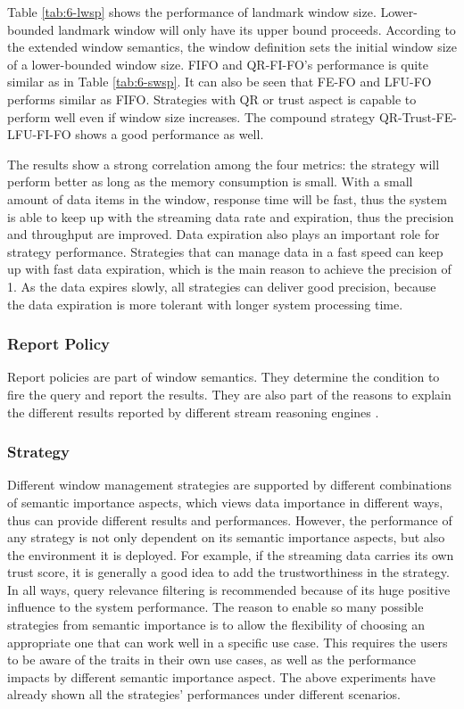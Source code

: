 Table \ref{tab:6-lwsp} shows the performance of landmark window size. 
Lower-bounded landmark window will only have its upper bound proceeds. 
According to the extended window semantics, the window definition sets the initial window size of a lower-bounded window size. 
FIFO and QR-FI-FO's performance is quite similar as in Table \ref{tab:6-swsp}. 
It can also be seen that FE-FO and LFU-FO performs similar as FIFO. 
Strategies with QR or trust aspect is capable to perform well even if window size increases. 
The compound strategy QR-Trust-FE-LFU-FI-FO shows a good performance as well. 

The results show a strong correlation among the four metrics: the strategy will perform better as long as the memory consumption is small.
With a small amount of data items in the window, response time will be fast, thus the system is able to keep up with the streaming data rate and expiration, thus the precision and throughput are improved. 
Data expiration also plays an important role for strategy performance. 
Strategies that can manage data in a fast speed can keep up with fast data expiration, which is the main reason to achieve the precision of 1. 
As the data expires slowly, all strategies can deliver good precision, because the data expiration is more tolerant with longer system processing time.
%
\subsubsection{Report Policy}
Report policies are part of window semantics. 
They determine the condition to fire the query and report the results.
They are also part of the reasons to explain the different results reported by different stream reasoning engines \cite{dell2013correctness}. 
%
\subsubsection{Strategy}
Different window management strategies are supported by different combinations of semantic importance aspects, which views data importance in different ways, thus can provide different results and performances. 
However, the performance of any strategy is not only dependent on its semantic importance aspects, but also the environment it is deployed. 
For example, if the streaming data carries its own trust score, it is generally a good idea to add the trustworthiness in the strategy. 
In all ways, query relevance filtering is recommended because of its huge positive influence to the system performance.
The reason to enable so many possible strategies from semantic importance is to allow the flexibility of choosing an appropriate one that can work well in a specific use case. 
This requires the users to be aware of the traits in their own use cases, as well as the performance impacts by different semantic importance aspect.
The above experiments have already shown all the strategies' performances under different scenarios.
%
